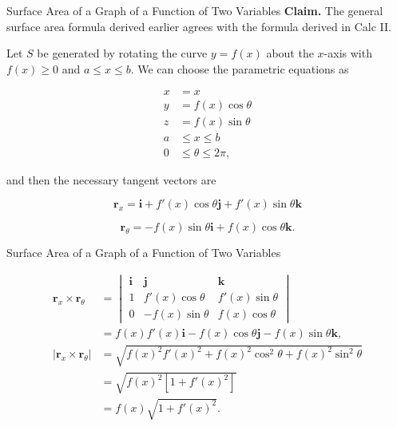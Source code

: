 \documentclass[11pt,english,
handout
]{beamer}
\begin{document}
\begin{frame}[t]{Surface Area of a Graph of a Function of Two Variables}
\small
\textbf{Claim.} The general surface area formula derived earlier agrees with the formula derived in Calc II.\pause

\begin{proofs}
Let $S$ be generated by rotating the curve $y=f(x)$ about the $x$-axis with $f(x)\geq 0$ and $a\leq x\leq b$. \pause We can choose the parametric equations as
\begin{minipage}{0.4\textwidth}

\begin{align*}
x&=x\\[2mm]
y&=f(x)\cos\theta\\[2mm]
z&=f(x)\sin\theta\\[2mm]
a&\leq x\leq b\\[2mm]
0&\leq \theta\leq 2\pi,
\end{align*}\pause
\end{minipage}%
\begin{minipage}{0.6\textwidth}
and then the necessary tangent vectors are 

\[
\mathbf{r}_x=\mathbf{i}+f'(x)\cos\theta\mathbf{j}+f'(x)\sin\theta\mathbf{k}
\]

\[
\mathbf{r}_\theta=-f(x)\sin\theta\mathbf{i}+f(x)\cos\theta\mathbf{k}.
\]
\end{minipage}
\end{proofs}
\end{frame}











\begin{frame}[t]{Surface Area of a Graph of a Function of Two Variables}
\small
\begin{proofs}


\begin{align*}
\mathbf{r}_x\times\mathbf{r}_\theta&=\begin{vmatrix}\mathbf{i}&\mathbf{j}&\mathbf{k}\\[2mm] 1 & f'(x)\cos\theta & f'(x)\sin\theta\\[2mm] 0 & -f(x)\sin\theta & f(x)\cos\theta\end{vmatrix}\\[2mm]
&=f(x)f'(x)\mathbf{i}-f(x)\cos\theta\mathbf{j}-f(x)\sin\theta\mathbf{k},\\[8mm]
|\mathbf{r}_x\times\mathbf{r}_\theta|&=\sqrt{f(x)^2f'(x)^2+f(x)^2\cos^2\theta+f(x)^2\sin^2\theta}\\[2mm]
&=\sqrt{f(x)^2[1+f'(x)^2]}\\[2mm]
&=f(x)\sqrt{1+f'(x)^2}.
\end{align*}
\end{proofs}
\end{frame}
\end{document}

